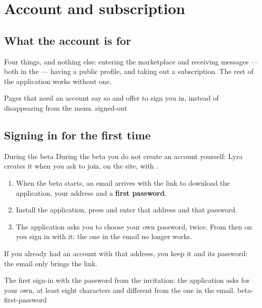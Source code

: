 \chapter{Account and subscription}\label{cap:account}

\section{What the account is for}\label{sez:account-for}

Four things, and nothing else: entering the marketplace and receiving
messages --- both in the  --- having a public profile, and
taking out a subscription. The rest of the application works without one.

  {Pages that need an account say so and offer to sign you in, instead of
   disappearing from the menu.}
  {signed-out}

\section{Signing in for the first time}\label{sez:first-sign-in}

\begin{pratica}{During the beta}
During the beta you do not create an account yourself: Lyra creates it when
you ask to join, on the site, with .

\begin{enumerate}
  \item When the beta starts, an email arrives with the link to download the
    application, your address and a \textbf{first password}.
  \item Install the application, press  and enter that
    address and that password.
  \item The application asks you to choose your own password, twice. From
    then on you sign in with it: the one in the email no longer works.
\end{enumerate}

If you already had an account with that address, you keep it and its
password: the email only brings the link.
\end{pratica}

  {The first sign-in with the password from the invitation: the application
   asks for your own, at least eight characters and different from the one
   in the email.}
  {beta-first-password}


